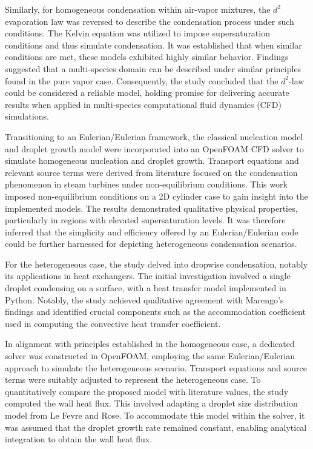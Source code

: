 \documentclass[12pt]{article}
\numberwithin{equation}{section}
\begin{document}
Similarly, for homogeneous condensation within air-vapor mixtures, the $d^{2}$ evaporation law was reversed to describe the condensation process under such conditions. The Kelvin equation was utilized to impose supersaturation conditions and thus simulate condensation. It was established that when similar conditions are met, these models exhibited highly similar behavior. Findings suggested that a multi-species domain can be described under similar principles found in the pure vapor case. Consequently, the study concluded that the $d^{2}$-law could be considered a reliable model, holding promise for delivering accurate results when applied in multi-species computational fluid dynamics (CFD) simulations. 

Transitioning to an Eulerian/Eulerian framework, the classical nucleation model and droplet growth model were incorporated into an OpenFOAM CFD solver to simulate homogeneous nucleation and droplet growth. Transport equations and relevant source terms were derived from literature focused on the condensation phenomenon in steam turbines under non-equilibrium conditions. This work imposed non-equilibrium conditions on a 2D cylinder case to gain insight into the implemented models. The results demonstrated qualitative physical properties, particularly in regions with elevated supersaturation levels. It was therefore inferred that the simplicity and efficiency offered by an Eulerian/Eulerian code could be further harnessed for depicting heterogeneous condensation scenarios.

For the heterogeneous case, the study delved into dropwise condensation, notably its applications in heat exchangers. The initial investigation involved a single droplet condensing on a surface, with a heat transfer model implemented in Python. Notably, the study achieved qualitative agreement with Marengo's findings and identified crucial components such as the accommodation coefficient used in computing the convective heat transfer coefficient.

In alignment with principles established in the homogeneous case, a dedicated solver was constructed in OpenFOAM, employing the same Eulerian/Eulerian approach to simulate the heterogeneous scenario. Transport equations and source terms were suitably adjusted to represent the heterogeneous case. To quantitatively compare the proposed model with literature values, the study computed the wall heat flux. This involved adapting a droplet size distribution model from Le Fevre and Rose. To accommodate this model within the solver, it was assumed that the droplet growth rate remained constant, enabling analytical integration to obtain the wall heat flux.
\end{document}
